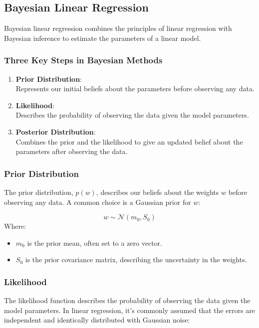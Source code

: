 \documentclass{article}
\begin{document}
\subsection{Bayesian Linear Regression}

Bayesian linear regression combines the principles of linear regression with Bayesian inference to estimate the parameters of a linear model.

\subsubsection{Three Key Steps in Bayesian Methods}

\begin{enumerate}
    \item \textbf{Prior Distribution}: \\Represents our initial beliefs about the parameters before observing any data.
    \item \textbf{Likelihood}: \\Describes the probability of observing the data given the model parameters.
    \item \textbf{Posterior Distribution}: \\Combines the prior and the likelihood to give an updated belief about the parameters after observing the data.
\end{enumerate}

\subsubsection{Prior Distribution}
The prior distribution, \( p(w) \), describes our beliefs about the weights \( w \) before observing any data. A common choice is a Gaussian prior for \( w \):

\[
w \sim \mathcal{N}(m_0, S_0)
\]
Where:
\begin{itemize}
    \item \( m_0 \) is the prior mean, often set to a zero vector.
    \item \( S_0 \) is the prior covariance matrix, describing the uncertainty in the weights.
\end{itemize}

\subsubsection{Likelihood}
The likelihood function describes the probability of observing the data given the model parameters. In linear regression, it's commonly assumed that the errors are independent and identically distributed with Gaussian noise:
\end{document}
